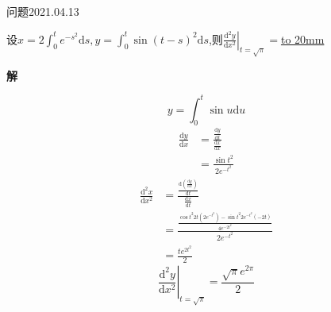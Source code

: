 \begin{mybox}{问题2021.04.13}
	
	\qquad 设$x=2\int_{0}^{t}e^{-s^2}\mathrm{d}s,y=\int_{0}^{t}\sin(t-s)^2 \mathrm{d}s$,则$\left.\frac{\mathrm{d}^2 y}{\mathrm{d}x^2}\right|_{t=\sqrt{\pi}}=$\underline{\hbox to 20mm{}}
\end{mybox}
\noindent
\textbf{解}

$$y=\int_{0}^{t}\sin u \mathrm{d}u$$
\begin{align*}
	\frac{\mathrm{d}y}{\mathrm{d}x}&=\frac{\frac{\mathrm{d}y}{\mathrm{d}t}}{\frac{\mathrm{d}x}{\mathrm{d}x}}\\
	&=\frac{\sin t^2}{2e^{-t^2}}
\end{align*}
\begin{align*}
	\frac{\mathrm{d}^2 x}{\mathrm{d}x^2}&=\frac{\frac{\mathrm{d}(\frac{\mathrm{d}y}{\mathrm{d}x})}{\mathrm{d}t}}{\frac{\mathrm{d}x}{\mathrm{d}t}}\\
	&=\frac{\frac{\cos t^2 2t(2e^{-t^2})-\sin t^2 2e^{-t^2}(-2t)}{4e^{-2t^2}}}{2e^{-t^2}}\\
	&=\frac{te^{2t^2}}{2}
\end{align*}
$$\left.\frac{\mathrm{d}^2 y}{\mathrm{d}x^2}\right|_{t=\sqrt{\pi}}=\frac{\sqrt{\pi} e^{2\pi}}{2}$$